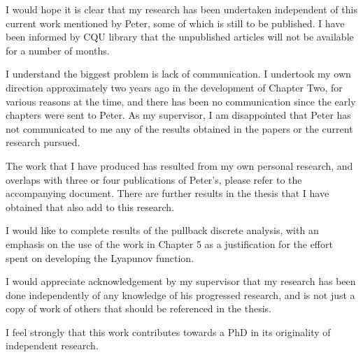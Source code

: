 \documentclass{article}
\begin{document}
I would hope it is clear that my research has been undertaken
independent of this current work mentioned by Peter, some of which
is still to be published.  I have been informed by CQU library
that the unpublished articles will not be available for a number
of months.

I understand the biggest problem  is lack of communication. I
undertook my own direction approximately two years ago in the
development of Chapter Two, for various reasons at the time, and
there has been no communication since the early  chapters were
sent to Peter. As my supervisor, I am disappointed that Peter has
not communicated to me any of the results obtained in the papers
or the current research pursued.

The work that I have produced has resulted from my own personal
research, and overlaps with three or four publications of Peter's,
please refer to the accompanying document. There are further
results in the thesis that I have obtained that also add to this
research.

I would  like to complete results of the pullback discrete
analysis, with an emphasis on the use of the work in Chapter 5 as
a justification for the effort spent on developing the Lyapunov
function.

I would appreciate acknowledgement by  my supervisor that my
research has been done independently of any knowledge of his
progressed research, and is not just a copy of work of others that
should be referenced in the thesis.

I feel strongly that this work contributes towards a PhD in its
originality of independent research.
\end{document}
